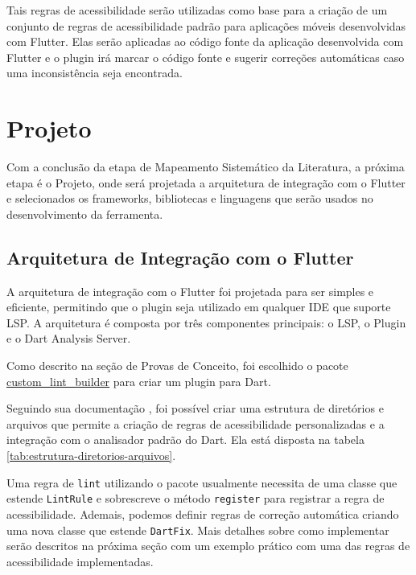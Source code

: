 Tais regras de acessibilidade serão utilizadas como base para a criação de um conjunto de regras de acessibilidade padrão para aplicações móveis desenvolvidas com Flutter. Elas serão aplicadas ao código fonte da aplicação desenvolvida com Flutter e o plugin irá marcar o código fonte e sugerir correções automáticas caso uma inconsistência seja encontrada.

\section{Projeto}

Com a conclusão da etapa de Mapeamento Sistemático da Literatura, a próxima etapa é o Projeto, onde será projetada a arquitetura de integração com o Flutter e selecionados os frameworks, bibliotecas e linguagens que serão usados no desenvolvimento da ferramenta.

\subsection{Arquitetura de Integração com o Flutter}

A arquitetura de integração com o Flutter foi projetada para ser simples e eficiente, permitindo que o plugin seja utilizado em qualquer IDE que suporte LSP. A arquitetura é composta por três componentes principais: o LSP, o Plugin e o Dart Analysis Server.

Como descrito na seção de Provas de Conceito, foi escolhido o pacote \href{https://pub.dev/packages/custom_lint_builder}{custom\_lint\_builder} para criar um plugin para Dart.

Seguindo sua documentação \cite{customlintbuilder}, foi possível criar uma estrutura de diretórios e arquivos que permite a criação de regras de acessibilidade personalizadas e a integração com o analisador padrão do Dart. Ela está disposta na tabela  \ref{tab:estrutura-diretorios-arquivos}.

Uma regra de \texttt{lint} utilizando o pacote usualmente necessita de uma classe que estende \texttt{LintRule} e sobrescreve o método \texttt{register} para registrar a regra de acessibilidade. Ademais, podemos definir regras de correção automática criando uma nova classe que estende \texttt{DartFix}. Mais detalhes sobre como implementar serão descritos na próxima seção com um exemplo prático com uma das regras de acessibilidade implementadas.

